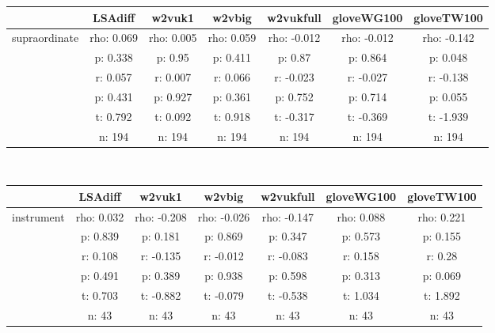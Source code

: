 \documentclass{article}
\begin{document}
\begin{tabular}{ccccccc|}\cline{2-7}
&\multicolumn{1}{|c}{LSAdiff} & w2vuk1 & w2vbig & w2vukfull & gloveWG100 & gloveTW100 \\\hline
\multicolumn{1}{|c|}{\multirow{6}{*}{supraordinate}} & rho: 0.069 & rho: 0.005 & rho: 0.059 & rho: -0.012 & rho: -0.012 & rho: -0.142 \\
\multicolumn{1}{|c|}{} & p: 0.338 & p: 0.95 & p: 0.411 & p: 0.87 & p: 0.864 & p: 0.048 \\
\multicolumn{1}{|c|}{} & r: 0.057 & r: 0.007 & r: 0.066 & r: -0.023 & r: -0.027 & r: -0.138 \\
\multicolumn{1}{|c|}{} & p: 0.431 & p: 0.927 & p: 0.361 & p: 0.752 & p: 0.714 & p: 0.055 \\
\multicolumn{1}{|c|}{} & t: 0.792 & t: 0.092 & t: 0.918 & t: -0.317 & t: -0.369 & t: -1.939 \\
\multicolumn{1}{|c|}{} & n: 194 & n: 194 & n: 194 & n: 194 & n: 194 & n: 194 \\
\hline
\end{tabular}\\
\begin{tabular}{ccccccc|}\cline{2-7}
&\multicolumn{1}{|c}{LSAdiff} & w2vuk1 & w2vbig & w2vukfull & gloveWG100 & gloveTW100 \\\hline
\multicolumn{1}{|c|}{\multirow{6}{*}{instrument}} & rho: 0.032 & rho: -0.208 & rho: -0.026 & rho: -0.147 & rho: 0.088 & rho: 0.221 \\
\multicolumn{1}{|c|}{} & p: 0.839 & p: 0.181 & p: 0.869 & p: 0.347 & p: 0.573 & p: 0.155 \\
\multicolumn{1}{|c|}{} & r: 0.108 & r: -0.135 & r: -0.012 & r: -0.083 & r: 0.158 & r: 0.28 \\
\multicolumn{1}{|c|}{} & p: 0.491 & p: 0.389 & p: 0.938 & p: 0.598 & p: 0.313 & p: 0.069 \\
\multicolumn{1}{|c|}{} & t: 0.703 & t: -0.882 & t: -0.079 & t: -0.538 & t: 1.034 & t: 1.892 \\
\multicolumn{1}{|c|}{} & n: 43 & n: 43 & n: 43 & n: 43 & n: 43 & n: 43 \\
\hline
\end{tabular}\\
\end{document}
